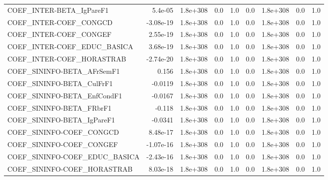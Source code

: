 \begin{tabular}{lrrrrrrrr}
COEF\_INTER-BETA\_IgPareF1             &     5.4e-05 &     1.8e+308 &     0.0 &      1.0 &        0.0 &    1.8e+308 &          0.0 &           1.0 \\
COEF\_INTER-COEF\_CONGCD               &   -3.08e-19 &     1.8e+308 &     0.0 &      1.0 &        0.0 &    1.8e+308 &          0.0 &           1.0 \\
COEF\_INTER-COEF\_CONGEF               &    2.55e-19 &     1.8e+308 &     0.0 &      1.0 &        0.0 &    1.8e+308 &          0.0 &           1.0 \\
COEF\_INTER-COEF\_EDUC\_BASICA          &    3.68e-19 &     1.8e+308 &     0.0 &      1.0 &        0.0 &    1.8e+308 &          0.0 &           1.0 \\
COEF\_INTER-COEF\_HORASTRAB            &   -2.74e-20 &     1.8e+308 &     0.0 &      1.0 &        0.0 &    1.8e+308 &          0.0 &           1.0 \\
COEF\_SININFO-BETA\_AFrSemF1           &       0.156 &     1.8e+308 &     0.0 &      1.0 &        0.0 &    1.8e+308 &          0.0 &           1.0 \\
COEF\_SININFO-BETA\_CulFrF1            &     -0.0119 &     1.8e+308 &     0.0 &      1.0 &        0.0 &    1.8e+308 &          0.0 &           1.0 \\
COEF\_SININFO-BETA\_EnfCondF1          &     -0.0167 &     1.8e+308 &     0.0 &      1.0 &        0.0 &    1.8e+308 &          0.0 &           1.0 \\
COEF\_SININFO-BETA\_FRbrF1             &      -0.118 &     1.8e+308 &     0.0 &      1.0 &        0.0 &    1.8e+308 &          0.0 &           1.0 \\
COEF\_SININFO-BETA\_IgPareF1           &     -0.0341 &     1.8e+308 &     0.0 &      1.0 &        0.0 &    1.8e+308 &          0.0 &           1.0 \\
COEF\_SININFO-COEF\_CONGCD             &    8.48e-17 &     1.8e+308 &     0.0 &      1.0 &        0.0 &    1.8e+308 &          0.0 &           1.0 \\
COEF\_SININFO-COEF\_CONGEF             &   -1.07e-16 &     1.8e+308 &     0.0 &      1.0 &        0.0 &    1.8e+308 &          0.0 &           1.0 \\
COEF\_SININFO-COEF\_EDUC\_BASICA        &   -2.43e-16 &     1.8e+308 &     0.0 &      1.0 &        0.0 &    1.8e+308 &          0.0 &           1.0 \\
COEF\_SININFO-COEF\_HORASTRAB          &    8.03e-18 &     1.8e+308 &     0.0 &      1.0 &        0.0 &    1.8e+308 &          0.0 &           1.0 \\

\end{tabular}
